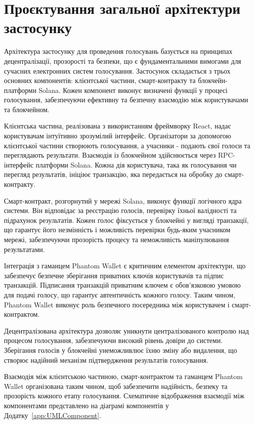 \documentclass[14pt]{extreport}
\begin{document}
  \section{Проєктування загальної архітектури застосунку}
  
  Архітектура застосунку для проведення голосувань базується на принципах децентралізації, прозорості та безпеки, що є фундаментальними вимогами для сучасних електронних систем голосування. Застосунок складається з трьох основних компонентів: клієнтської частини, смарт-контракту та блокчейн-платформи Solana. Кожен компонент виконує визначені функції у процесі голосування, забезпечуючи ефективну та безпечну взаємодію між користувачами та блокчейном.

  Клієнтська частина, реалізована з використанням фреймворку React, надає користувачам інтуїтивно зрозумілий інтерфейс. Організатори за допомогою клієнтської частини створюють голосування, а учасники - подають свої голоси та переглядають результати. Взаємодія із блокчейном здійснюється через RPC-інтерфейс платформи Solana. Кожна дія користувача, така як голосування чи перегляд результатів, ініціює транзакцію, яка передається на обробку до смарт-контракту.

  Смарт-контракт, розгорнутий у мережі Solana, виконує функції логічного ядра системи. Він відповідає за реєстрацію голосів, перевірку їхньої валідності та підрахунок результатів. Кожен голос фіксується у блокчейні у вигляді транзакції, що гарантує його незмінність і можливість перевірки будь-яким учасником мережі, забезпечуючи прозорість процесу та неможливість маніпулювання результатами.

  Інтеграція з гаманцем Phantom Wallet є критичним елементом архітектури, що забезпечує безпечне зберігання приватних ключів користувачів та підпис транзакцій. Підписання транзакцій приватним ключем є обов'язковою умовою для подачі голосу, що гарантує автентичність кожного голосу. Таким чином, Phantom Wallet виконує роль безпечного посередника між користувачем і смарт-контрактом.

  Децентралізована архітектура дозволяє уникнути централізованого контролю над процесом голосування, забезпечуючи високий рівень довіри до системи. Зберігання голосів у блокчейні унеможливлює їхню зміну або видалення, що створює надійний механізм підтвердження результатів голосування.

  Взаємодія між клієнтською частиною, смарт-контрактом та гаманцем Phantom Wallet організована таким чином, щоб забезпечити надійність, безпеку та прозорість кожного етапу голосування. Схематичне відображення взаємодії між компонентами представлено на діаграмі компонентів у Додатку~\ref{app:UMLComponent}.
  
\end{document}
